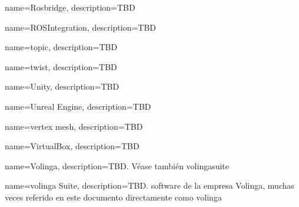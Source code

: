 {
    name={Rosbridge},
    description={TBD}
}

{
    name={ROSIntegration},
    description={TBD}
}



{
    name={topic},
    description={TBD}
}

{
    name={twist},
    description={TBD}
}


{
    name={Unity},
    description={TBD}
}

{
    name={Unreal Engine},
    description={TBD}
}


{
    name={vertex \gls{mesh}},
    description={TBD}
}

{
    name={VirtualBox},
    description={TBD}
}

{
    name={Volinga},
    description={TBD. Véase también \gls{volingasuite}}
}

{
    name={\gls{volinga} Suite},
    description={TBD. software de la empresa Volinga, muchas veces referido en este documento directamente como \gls{volinga}}
}






